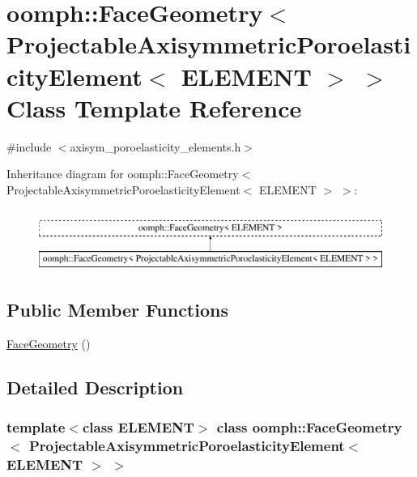 \hypertarget{classoomph_1_1FaceGeometry_3_01ProjectableAxisymmetricPoroelasticityElement_3_01ELEMENT_01_4_01_4}{}\section{oomph\+:\+:Face\+Geometry$<$ Projectable\+Axisymmetric\+Poroelasticity\+Element$<$ E\+L\+E\+M\+E\+NT $>$ $>$ Class Template Reference}
\label{classoomph_1_1FaceGeometry_3_01ProjectableAxisymmetricPoroelasticityElement_3_01ELEMENT_01_4_01_4}


{\ttfamily \#include $<$axisym\+\_\+poroelasticity\+\_\+elements.\+h$>$}

Inheritance diagram for oomph\+:\+:Face\+Geometry$<$ Projectable\+Axisymmetric\+Poroelasticity\+Element$<$ E\+L\+E\+M\+E\+NT $>$ $>$\+:\begin{figure}[H]
\begin{center}
\leavevmode
\includegraphics[height=2.000000cm]{classoomph_1_1FaceGeometry_3_01ProjectableAxisymmetricPoroelasticityElement_3_01ELEMENT_01_4_01_4}
\end{center}
\end{figure}
\subsection*{Public Member Functions}
\begin{DoxyCompactItemize}
\item 
\hyperlink{classoomph_1_1FaceGeometry_3_01ProjectableAxisymmetricPoroelasticityElement_3_01ELEMENT_01_4_01_4_a85d44a257746442a32b1cfbe1cf27f21}{Face\+Geometry} ()
\end{DoxyCompactItemize}


\subsection{Detailed Description}
\subsubsection*{template$<$class E\+L\+E\+M\+E\+NT$>$\newline
class oomph\+::\+Face\+Geometry$<$ Projectable\+Axisymmetric\+Poroelasticity\+Element$<$ E\+L\+E\+M\+E\+N\+T $>$ $>$}


